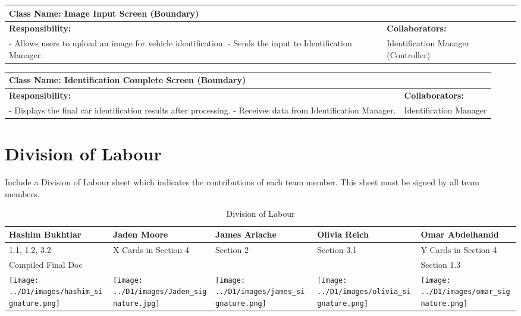 \documentclass[]{article}
\begin{document}
\begin{table}[ht]
    \centering
    \begin{tabular}{|p{7cm}|p{7cm}|}
    \hline
     \multicolumn{2}{|l|}{\textbf{Class Name: Image Input Screen (Boundary)}} \\
    \hline
    \textbf{Responsibility:} & \textbf{Collaborators:} \\
    \hline
    - Allows users to upload an image for vehicle identification. \newline
    - Sends the input to Identification Manager.
    &
    Identification Manager (Controller) \\
    \hline
    \end{tabular}
\end{table}

\begin{table}[ht]
    \centering
    \begin{tabular}{|p{7cm}|p{7cm}|}
    \hline
     \multicolumn{2}{|l|}{\textbf{Class Name: Identification Complete Screen (Boundary)}} \\
    \hline
    \textbf{Responsibility:} & \textbf{Collaborators:} \\
    \hline
    - Displays the final car identification results after processing. \newline
    - Receives data from Identification Manager.
    &
    Identification Manager \\
    \hline
    \end{tabular}
\end{table}



\clearpage
\appendix
\section{Division of Labour}
\label{sec:division_of_labour}
Include a Division of Labour sheet which indicates the contributions of each team member. This sheet must be signed by all team members.
\begin{table}[h!]
\centering
\begin{tabular}{|p{3cm}|p{3.5cm}|p{3cm}|p{3cm}|p{3.5cm}|}
\hline
Hashim Bukhtiar & Jaden Moore & James Ariache & Olivia Reich & Omar Abdelhamid \\ \hline
1.1, 1.2, 3.2 & X Cards in Section 4 & Section 2 & Section 3.1 & Y Cards in Section 4 \\ 
Compiled Final Doc &  &  &  & Section 1.3 \\
\texttt{[image: ../D1/images/hashim\_signature.png]} & \texttt{[image: ../D1/images/Jaden\_signature.jpg]} &
\texttt{[image: ../D1/images/james\_signature.png]}& \texttt{[image: ../D1/images/olivia\_signature.png]} & \texttt{[image: ../D1/images/omar\_signature.png]}  \\
\hline
\end{tabular}
\caption{Division of Labour} 
\label{tab:division_of_labour}
\end{table}
\end{document}
